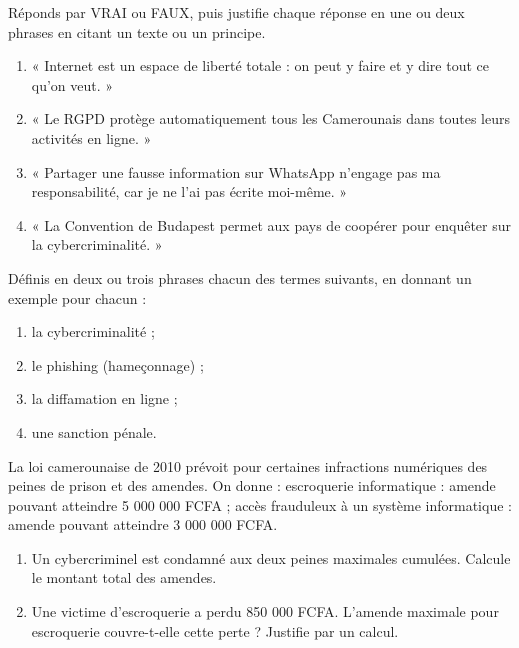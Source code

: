 \documentclass[11pt]{article}
\begin{document}
\begin{exercice}
Réponds par VRAI ou FAUX, puis justifie chaque réponse en une ou deux phrases en citant un texte ou un principe.

\begin{enumerate}
\item « Internet est un espace de liberté totale : on peut y faire et y dire tout ce qu'on veut. »
\item « Le RGPD protège automatiquement tous les Camerounais dans toutes leurs activités en ligne. »
\item « Partager une fausse information sur WhatsApp n'engage pas ma responsabilité, car je ne l'ai pas écrite moi-même. »
\item « La Convention de Budapest permet aux pays de coopérer pour enquêter sur la cybercriminalité. »
\end{enumerate}
\end{exercice}

\begin{exercice}[Définitions]
Définis en deux ou trois phrases chacun des termes suivants, en donnant un exemple pour chacun :
\begin{enumerate}
\item la cybercriminalité ;
\item le phishing (hameçonnage) ;
\item la diffamation en ligne ;
\item une sanction pénale.
\end{enumerate}
\end{exercice}

\begin{exercice}
La loi camerounaise de 2010 prévoit pour certaines infractions numériques des peines de prison et des amendes. On donne : escroquerie informatique : amende pouvant atteindre 5 000 000 FCFA ; accès frauduleux à un système informatique : amende pouvant atteindre 3 000 000 FCFA.

\begin{enumerate}
\item Un cybercriminel est condamné aux deux peines maximales cumulées. Calcule le montant total des amendes.
\item Une victime d'escroquerie a perdu 850 000 FCFA. L'amende maximale pour escroquerie couvre-t-elle cette perte ? Justifie par un calcul.
\end{enumerate}
\end{exercice}
\end{document}
